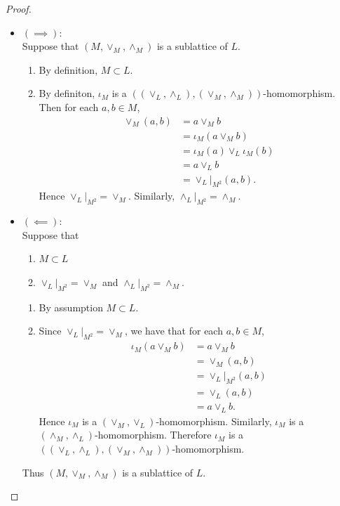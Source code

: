 \documentclass{book}
\begin{document}
	\begin{proof}\
		\begin{itemize}
			\item $(\implies)$: \\
			Suppose that $(M, \vee_M, \wedge_M)$ is a sublattice of $L$. 
			\begin{enumerate}
				\item By definition, $M \subset L$.
				\item By definiton, $\iota_M$ is a $((\vee_L, \wedge_L), (\vee_M, \wedge_M))$-homomorphism. Then for each $a,b \in M$, 
				\begin{align*}
					\vee_M(a,b)
					& = a \vee_M b \\
					& = \iota_M(a \vee_M b) \\
					& = \iota_M(a) \vee_L \iota_M(b) \\
					& = a \vee_L b \\
					& = \vee_L|_{M^2}(a,b). 
				\end{align*} 
				Hence $\vee_L|_{M^2} = \vee_M$. Similarly, $\wedge_L|_{M^2} = \wedge_M$. 
			\end{enumerate}
			\item  $(\impliedby)$: \\
			Suppose that 
			\begin{enumerate}
				\item $M \subset L$
				\item $\vee_L|_{M^2} = \vee_M$ and $\wedge_L|_{M^2} = \wedge_M$. 
			\end{enumerate} 
			\begin{enumerate}
				\item By assumption $M \subset L$. 
				\item Since $\vee_L|_{M^2} = \vee_M$, we have that for each $a,b \in M$, 
				\begin{align*}
					\iota_M(a \vee_M b)
					& = a \vee_M b \\
					& = \vee_M(a,b) \\
					& = \vee_L|_{M^2}(a,b) \\
					& = \vee_L(a,b) \\
					& = a \vee_L b.
				\end{align*}
				Hence $\iota_M$ is a $(\vee_M, \vee_L)$-homomorphism. Similarly, $\iota_M$ is a $(\wedge_M, \wedge_L)$-homomorphism. Therefore $\iota_M$ is a $((\vee_L, \wedge_L), (\vee_M, \wedge_M))$-homomorphism. 
			\end{enumerate}
			Thus $(M, \vee_M, \wedge_M)$ is a sublattice of $L$. 
		\end{itemize}
	\end{proof}
	
\end{document}
